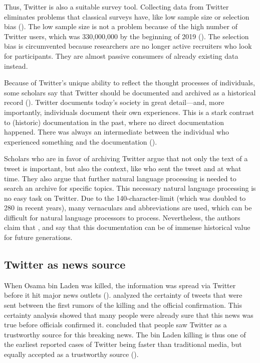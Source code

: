 Thus, Twitter is also a suitable survey tool. Collecting data from Twitter eliminates problems that classical surveys have, like low sample size or selection bias (\cite{takabeTwitterSurveyTool2016}). The low sample size is not a problem because of the high number of Twitter users, which was 330,000,000 by the beginning of 2019 (\cite{TwitterMonthlyActive}). The selection bias is circumvented because researchers are no longer active recruiters who look for participants. They are almost passive consumers of already existing data instead. 

Because of Twitter's unique ability to reflect the thought processes of individuals, some scholars say that Twitter should be documented and archived as a historical record (\cite{risse2014documenting}). Twitter documents today's society in great detail---and, more importantly, individuals document their own experiences. This is a stark contrast to (historic) documentation in the past, where no direct documentation happened. There was always an intermediate between the individual who experienced something and the documentation (\citeauthor{risse2014documenting}).

Scholars who are in favor of archiving Twitter argue that not only the text of a tweet is important, but also the context, like who sent the tweet and at what time. They also argue that further natural language processing is needed to search an archive for specific topics. This necessary natural language processing is no easy task on Twitter. Due to the 140-character-limit (which was doubled to 280 in recent years), many vernaculars and abbreviations are used, which can be difficult for natural language processors to process. Nevertheless, the authors claim that  \parencite[9]{risse2014documenting}, and say that this documentation can be of immense historical value for future generations.

\subsection{Twitter as news source}  %
When Osama bin Laden was killed, the information was spread via Twitter before it hit major news outlets (\cite{hu2012breaking}). \citeauthor{hu2012breaking} analyzed the certainty of tweets that were sent between the first rumors of the killing and the official confirmation. This certainty analysis showed that many people were already sure that this news was true before officials confirmed it. \citeauthor{hu2012breaking} concluded that people saw Twitter as a trustworthy source for this breaking news. The bin Laden killing is thus one of the earliest reported cases of Twitter being faster than traditional media, but equally accepted as a trustworthy source (\cite[2751]{hu2012breaking}).


